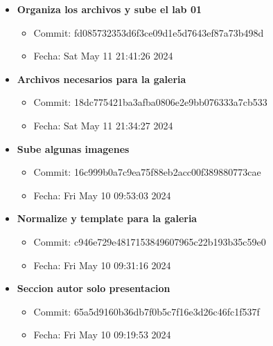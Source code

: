 \begin{itemize}
    \item \textbf{Organiza los archivos y sube el lab 01}
    \begin{itemize}
        \item Commit: fd085732353d6f3ce09d1e5d7643ef87a73b498d
        \item Fecha: Sat May 11 21:41:26 2024
    \end{itemize}
    
    \item \textbf{Archivos necesarios para la galeria}
    \begin{itemize}
        \item Commit: 18dc775421ba3afba0806e2e9bb076333a7cb533
        \item Fecha: Sat May 11 21:34:27 2024
    \end{itemize}
    
    \item \textbf{Sube algunas imagenes}
    \begin{itemize}
        \item Commit: 16c999b0a7c9ea75f88eb2acc00f389880773cae
        \item Fecha: Fri May 10 09:53:03 2024
    \end{itemize}
    
    \item \textbf{Normalize y template para la galeria}
    \begin{itemize}
        \item Commit: c946e729e4817153849607965c22b193b35c59e0
        \item Fecha: Fri May 10 09:31:16 2024
    \end{itemize}
    
    \item \textbf{Seccion autor solo presentacion}
    \begin{itemize}
        \item Commit: 65a5d9160b36db7f0b5c7f16e3d26c46fc1f537f
        \item Fecha: Fri May 10 09:19:53 2024
    \end{itemize}
\end{itemize}
